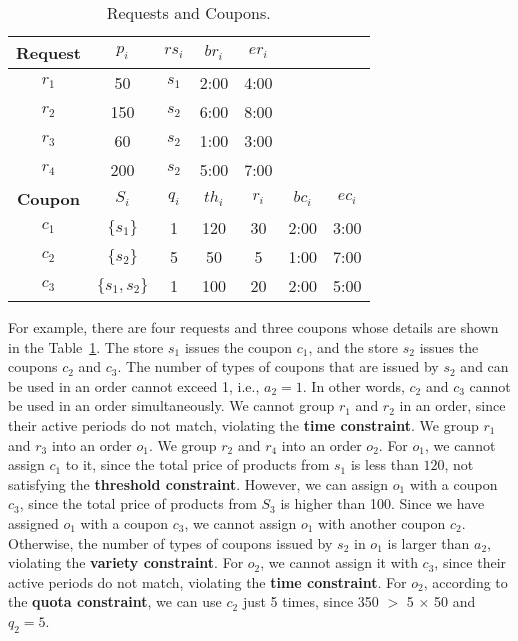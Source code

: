 \begin{table}[t]
	\centering\vspace{-3ex}
	\caption{\small Requests and Coupons.} \label{table:problem}
	{\scriptsize
		\begin{tabular}{c|c|c|c|c|c|c}
			
			{\bf Request} & {\bf $p_i$} & {\bf $rs_i$} & {\bf $br_i$} & {\bf $er_i$} & & \\ \hline
			$r_1$ & 50 & $s_1$ & 2:00 & 4:00 & & \\
			$r_2$ & 150 & $s_2$ & 6:00 & 8:00 & & \\
			$r_3$ & 60 & $s_2$ & 1:00 & 3:00 & & \\
			$r_4$ & 200 & $s_2$ & 5:00 & 7:00 & & \\
			\hline \hline
			{\bf Coupon} & {\bf $S_i$} & {\bf $q_i$} & {\bf $th_i$} & {\bf $r_i$} & {\bf $bc_i$} & {\bf $ec_i$}\\ \hline
			$c_1$ & $\{s_1\}$ & 1 & 120 & 30 & 2:00 & 3:00\\
			$c_2$ & $\{s_2\}$ & 5 & 50 & 5 & 1:00 & 7:00\\
			$c_3$ & $\{s_1, s_2\}$ & 1 & 100 & 20 & 2:00 & 5:00\\
			\hline
		\end{tabular}
	}
\end{table}

For example, there are four requests and three coupons whose details are shown in the Table~\ref{table:problem}. The store $s_1$ issues the coupon $c_1$, and the store $s_2$ issues the coupons $c_2$ and $c_3$. The number of types of coupons that are issued by $s_2$ and can be used in an order cannot exceed 1, i.e., $a_2 = 1$. In other words, $c_2$ and $c_3$ cannot be used in an order simultaneously. We cannot group $r_1$ and $r_2$ in an order, since their active periods do not match, violating the \textbf{time constraint}. We group $r_1$ and $r_3$ into an order $o_1$. We group $r_2$ and $r_4$ into an order $o_2$. For $o_1$, we cannot assign $c_1$ to it, since the total price of products from $s_1$ is less than $120$, not satisfying the \textbf{threshold constraint}. However, we can assign $o_1$ with a coupon $c_3$, since the total price of products from $S_3$ is higher than 100. Since we have assigned $o_1$ with a coupon $c_3$, we cannot assign $o_1$ with another coupon $c_2$. Otherwise, the number of types of coupons issued by $s_2$ in $o_1$ is larger than $a_2$, violating the \textbf{variety constraint}. For $o_2$, we cannot assign it with $c_3$, since their active periods do not match, violating the \textbf{time constraint}. For $o_2$, according to the \textbf{quota constraint}, we can use $c_2$ just 5 times, since 350 $>$ 5 $\times$ 50 and $q_2 = 5$.
